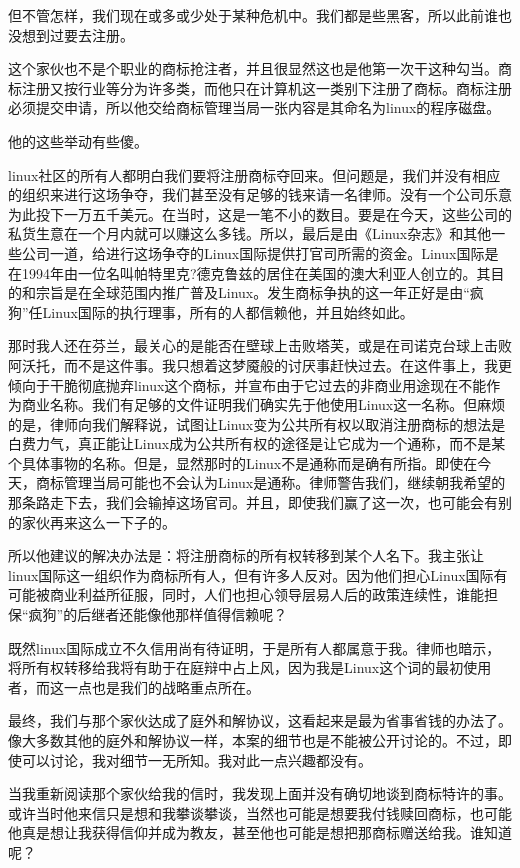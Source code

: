 但不管怎样，我们现在或多或少处于某种危机中。我们都是些黑客，所以此前谁也没想到过要去注册。

这个家伙也不是个职业的商标抢注者，并且很显然这也是他第一次干这种勾当。商标注册又按行业等分为许多类，而他只在计算机这一类别下注册了商标。商标注册必须提交申请，所以他交给商标管理当局一张内容是其命名为linux的程序磁盘。

他的这些举动有些傻。

linux社区的所有人都明白我们要将注册商标夺回来。但问题是，我们并没有相应的组织来进行这场争夺，我们甚至没有足够的钱来请一名律师。没有一个公司乐意为此投下一万五千美元。在当时，这是一笔不小的数目。要是在今天，这些公司的私货生意在一个月内就可以赚这么多钱。所以，最后是由《Linux杂志》和其他一些公司一道，给进行这场争夺的Linux国际提供打官司所需的资金。Linux国际是在1994年由一位名叫帕特里克?德克鲁兹的居住在美国的澳大利亚人创立的。其目的和宗旨是在全球范围内推广普及Linux。发生商标争执的这一年正好是由“疯狗”任Linux国际的执行理事，所有的人都信赖他，并且始终如此。

那时我人还在芬兰，最关心的是能否在壁球上击败塔芙，或是在司诺克台球上击败阿沃托，而不是这件事。我只想着这梦魇般的讨厌事赶快过去。在这件事上，我更倾向于干脆彻底抛弃linux这个商标，并宣布由于它过去的非商业用途现在不能作为商业名称。我们有足够的文件证明我们确实先于他使用Linux这一名称。但麻烦的是，律师向我们解释说，试图让Linux变为公共所有权以取消注册商标的想法是白费力气，真正能让Linux成为公共所有权的途径是让它成为一个通称，而不是某个具体事物的名称。但是，显然那时的Linux不是通称而是确有所指。即使在今天，商标管理当局可能也不会认为Linux是通称。律师警告我们，继续朝我希望的那条路走下去，我们会输掉这场官司。并且，即使我们赢了这一次，也可能会有别的家伙再来这么一下子的。

所以他建议的解决办法是：将注册商标的所有权转移到某个人名下。我主张让linux国际这一组织作为商标所有人，但有许多人反对。因为他们担心Linux国际有可能被商业利益所征服，同时，人们也担心领导层易人后的政策连续性，谁能担保“疯狗”的后继者还能像他那样值得信赖呢？

既然linux国际成立不久信用尚有待证明，于是所有人都属意于我。律师也暗示，将所有权转移给我将有助于在庭辩中占上风，因为我是Linux这个词的最初使用者，而这一点也是我们的战略重点所在。

最终，我们与那个家伙达成了庭外和解协议，这看起来是最为省事省钱的办法了。像大多数其他的庭外和解协议一样，本案的细节也是不能被公开讨论的。不过，即使可以讨论，我对细节一无所知。我对此一点兴趣都没有。

当我重新阅读那个家伙给我的信时，我发现上面并没有确切地谈到商标特许的事。或许当时他来信只是想和我攀谈攀谈，当然也可能是想要我付钱赎回商标，也可能他真是想让我获得信仰并成为教友，甚至他也可能是想把那商标赠送给我。谁知道呢？

